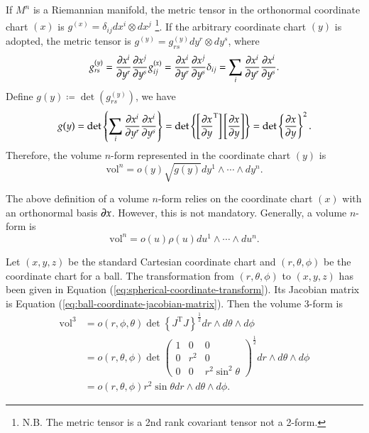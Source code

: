 \documentclass[11pt, a4paper]{book}
\begin{document}
If $M^n$ is a Riemannian manifold, the metric tensor in the orthonormal coordinate chart
$(x)$ is $g^{(x)} = \delta_{ij} dx^i \otimes dx^j$ \footnote{N.B. The metric tensor is a
  2nd rank covariant tensor not a 2-form.}. If the arbitrary coordinate chart $(y)$
is adopted, the metric tensor is $g^{(y)} = g_{rs}^{(y)} dy^r \otimes dy^s$, where
\begin{equation*}
  g_{rs}^{(y)} = \frac{\partial x^i}{\partial y^r} \frac{\partial x^j}{\partial y^s} g_{ij}^{(x)}
  = \frac{\partial x^i}{\partial y^r} \frac{\partial x^j}{\partial y^s} \delta_{ij} = \sum_i
  \frac{\partial x^i}{\partial y^r} \frac{\partial x^i}{\partial y^s}.
\end{equation*}
Define $g(y) \coloneqq \det(g_{rs}^{(y)})$, we have
\begin{equation*}
  g(y) = \det \left\{ \sum_i
    \frac{\partial x^i}{\partial y^r} \frac{\partial x^i}{\partial y^s} \right\} = \det \left\{
    \left[ \frac{\partial x}{\partial y}^{\mathrm{T}} \right] \left[ \frac{\partial x}{\partial y}
    \right] \right\} = \det \left\{ \frac{\partial x}{\partial y} \right\}^2.
\end{equation*}
Therefore, the volume $n$-form represented in the coordinate chart $(y)$ is
\begin{equation}
  \label{eq:volume-3-form}
  \mathrm{vol}^n = o(y) \sqrt{g(y)} dy^1 \wedge\cdots\wedge dy^n.
\end{equation}
\begin{Remark}
  The above definition of a volume $n$-form relies on the coordinate chart $(x)$ with an
  orthonormal basis $\boldsymbol{\partial}x$. However, this is not mandatory. Generally, a volume
  $n$-form is
  \begin{equation}
    \mathrm{vol}^n = o(u) \rho(u) du^1 \wedge \cdots \wedge du^n.
  \end{equation}
\end{Remark}

\begin{Example}
  Let $(x,y,z)$ be the standard Cartesian coordinate chart and $(r,\theta,\phi)$ be the
  coordinate chart for a ball. The transformation from $(r,\theta,\phi)$ to $(x,y,z)$
  has been given in Equation (\ref{eq:spherical-coordinate-transform}). Its Jacobian
  matrix is Equation (\ref{eq:ball-coordinate-jacobian-matrix}). Then the volume 3-form is
  \begin{equation}
    \begin{aligned}
      \mathrm{vol}^3 &= o(r,\phi,\theta) \det \left\{ J^{\mathrm{T}} J
      \right\}^{\frac{1}{2}} dr \wedge d\theta \wedge d\phi \\
      &= o(r,\theta,\phi) \det \begin{pmatrix}
        1 & 0 & 0 \\
        0 & r^2 & 0 \\
        0 & 0 & r^2\sin^2\theta
      \end{pmatrix}^{\frac{1}{2}} dr \wedge d\theta \wedge d\phi \\
      & = o(r,\theta,\phi) r^2\sin\theta dr \wedge d\theta \wedge d\phi.
    \end{aligned}
  \end{equation}
\end{Example}
\end{document}
